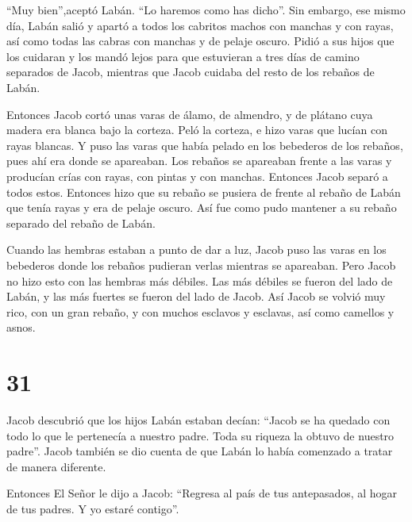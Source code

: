  ``Muy bien'',aceptó Labán. ``Lo haremos como has dicho''.
 Sin embargo, ese mismo día, Labán salió y apartó a todos
los cabritos machos con manchas y con rayas, así como todas las cabras
con manchas y de pelaje oscuro. Pidió a sus hijos que los cuidaran y los
mandó lejos  para que estuvieran a tres días de camino
separados de Jacob, mientras que Jacob cuidaba del resto de los rebaños
de Labán.

 Entonces Jacob cortó unas varas de álamo, de almendro, y
de plátano cuya madera era blanca bajo la corteza. Peló la corteza, e
hizo varas que lucían con rayas blancas.  Y puso las varas
que había pelado en los bebederos de los rebaños, pues ahí era donde se
apareaban.  Los rebaños se apareaban frente a las varas y
producían crías con rayas, con pintas y con manchas. 
Entonces Jacob separó a todos estos. Entonces hizo que su rebaño se
pusiera de frente al rebaño de Labán que tenía rayas y era de pelaje
oscuro. Así fue como pudo mantener a su rebaño separado del rebaño de
Labán.

 Cuando las hembras estaban a punto de dar a luz, Jacob
puso las varas en los bebederos donde los rebaños pudieran verlas
mientras se apareaban.  Pero Jacob no hizo esto con las
hembras más débiles. Las más débiles se fueron del lado de Labán, y las
más fuertes se fueron del lado de Jacob.  Así Jacob se
volvió muy rico, con un gran rebaño, y con muchos esclavos y esclavas,
así como camellos y asnos.

\hypertarget{section-30}{%
\section{31}\label{section-30}}

 Jacob descubrió que los hijos Labán estaban decían: ``Jacob
se ha quedado con todo lo que le pertenecía a nuestro padre. Toda su
riqueza la obtuvo de nuestro padre''.  Jacob también se dio
cuenta de que Labán lo había comenzado a tratar de manera diferente.

 Entonces El Señor le dijo a Jacob: ``Regresa al país de tus
antepasados, al hogar de tus padres. Y yo estaré contigo''.

